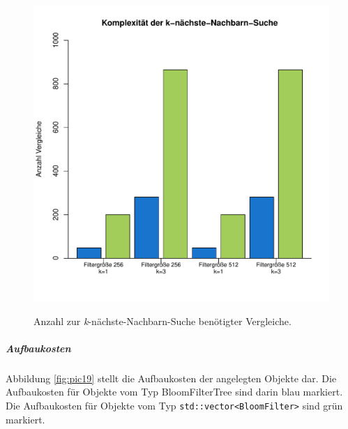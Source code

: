 \begin{figure}[hptb]
	\centering
	\includegraphics[scale=0.7]{pictures/compl.pdf}\\
	\caption[Anzahl zur \textit{k}-nächste-Nachbarn-Suche benötigter Vergleiche]{Anzahl zur \textit{k}-nächste-Nachbarn-Suche benötigter Vergleiche.}
\end{figure} 
\subparagraph*{Aufbaukosten}
Abbildung \ref{fig:pic19} stellt die Aufbaukosten der angelegten Objekte dar. Die Aufbaukosten für Objekte vom Typ BloomFilterTree sind darin blau markiert. Die Aufbaukosten für Objekte vom Typ \texttt{std::vector<BloomFilter>} sind grün markiert. 
